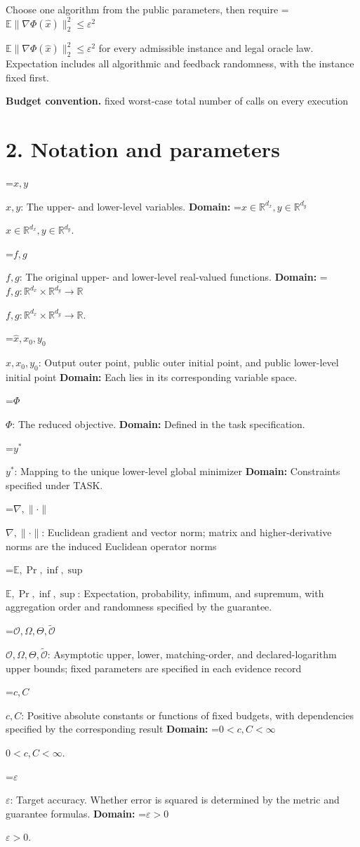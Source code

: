 \documentclass[10pt,a4paper]{article}
\newcommand{\AtlasMath}[1]{\par\begingroup\centering\setbox0=\hbox{$\displaystyle #1$}\ifdim\wd0>1.4\linewidth\typeout{ATLAS WIDE FORMULA: \the\wd0}\fi\ifdim\wd0>\linewidth\resizebox{\linewidth}{!}{\box0}\else\box0\fi\par\endgroup}
\newcommand{\AtlasInlineMath}[1]{\begingroup\setbox0=\hbox{$#1$}\ifdim\wd0>.4\linewidth\endgroup\AtlasMath{#1}\else\endgroup$#1$\fi}
\begin{document}
Choose one algorithm from the public parameters, then require \AtlasInlineMath{\mathbb{E}\|\nabla\Phi(\widehat{x})\|_2^2\le\varepsilon^2} for every admissible instance and legal oracle law. Expectation includes all algorithmic and feedback randomness, with the instance fixed first.

\textbf{Budget convention.} fixed worst-case total number of calls on every execution

\section{2. Notation and parameters}
\AtlasInlineMath{x,y}: The upper- and lower-level variables. \textbf{Domain:} \AtlasInlineMath{x\in\mathbb R^{d_x},y\in\mathbb R^{d_y}}.

\AtlasInlineMath{f,g}: The original upper- and lower-level real-valued functions. \textbf{Domain:} \AtlasInlineMath{f,g:\mathbb R^{d_x}\times\mathbb R^{d_y}\to\mathbb R}.

\AtlasInlineMath{\widehat x,x_0,y_0}: Output outer point, public outer initial point, and public lower-level initial point \textbf{Domain:} Each lies in its corresponding variable space.

\AtlasInlineMath{\Phi}: The reduced objective. \textbf{Domain:} Defined in the task specification.

\AtlasInlineMath{y^*}: Mapping to the unique lower-level global minimizer \textbf{Domain:} Constraints specified under TASK.

\AtlasInlineMath{\nabla,\|\cdot\|}: Euclidean gradient and vector norm; matrix and higher-derivative norms are the induced Euclidean operator norms

\AtlasInlineMath{\mathbb E,\Pr,\inf,\sup}: Expectation, probability, infimum, and supremum, with aggregation order and randomness specified by the guarantee.

\AtlasInlineMath{\mathcal O,\Omega,\Theta,\widetilde{\mathcal O}}: Asymptotic upper, lower, matching-order, and declared-logarithm upper bounds; fixed parameters are specified in each evidence record

\AtlasInlineMath{c,C}: Positive absolute constants or functions of fixed budgets, with dependencies specified by the corresponding result \textbf{Domain:} \AtlasInlineMath{0<c,C<\infty}.

\AtlasInlineMath{\varepsilon}: Target accuracy. Whether error is squared is determined by the metric and guarantee formulas. \textbf{Domain:} \AtlasInlineMath{\varepsilon>0}.
\end{document}

